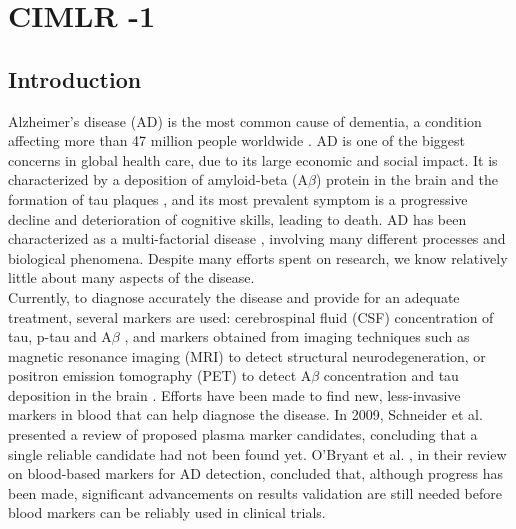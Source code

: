 \section{CIMLR -1}
\subsection{Introduction}
Alzheimer's disease (AD) is the most common cause of dementia, a condition affecting more than 47 million people worldwide \cite{AlzheimersAssociation}. AD is one of the biggest concerns in global health care, due to its large economic and social impact. It is characterized by a deposition of amyloid-beta (A$\beta$) protein in the brain and the formation of tau plaques \cite{Jack2018}, and its most prevalent symptom is a progressive decline and deterioration of cognitive skills, leading to death. AD has been characterized as a multi-factorial disease \cite{Jack2013,Jack2018}, involving many different processes and biological phenomena. Despite many efforts spent on research, we know relatively little about many aspects of the disease. \\

Currently, to diagnose accurately the disease and provide for an adequate treatment, several markers are used: cerebrospinal fluid (CSF) concentration of tau, p-tau and A$\beta$ \cite{Andreasen1999}, and markers obtained from imaging techniques such as magnetic resonance imaging (MRI) to detect structural neurodegeneration, or positron emission tomography (PET) to detect A$\beta$ concentration and tau deposition in the brain \cite{Weiner2005,Clark2011}. Efforts have been made to find new, less-invasive markers in blood that can help diagnose the disease. In 2009, Schneider et al. \cite{Schneider2009} presented a review of proposed plasma marker candidates, concluding that a single reliable candidate had not been found yet. O'Bryant et al. \cite{Obryant}, in their review on blood-based markers for AD detection, concluded that, although progress has been made, significant advancements on results validation are still needed before blood markers can be reliably used in clinical trials. \\

